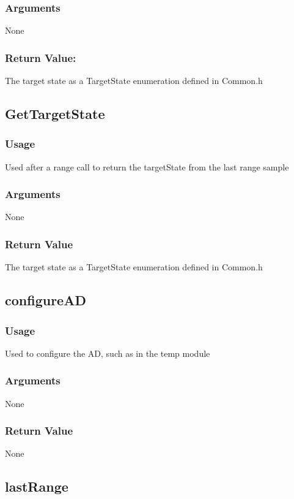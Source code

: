 \documentclass[]{report}
\begin{document}
\subsubsection{Arguments}
None

\subsubsection{Return Value:}
The target state as a TargetState enumeration defined in Common.h

\subsection{GetTargetState}
\subsubsection{Usage}
Used after a range call to return the targetState from the last range sample

\subsubsection{Arguments}
None

\subsubsection{Return Value}
The target state as a TargetState enumeration defined in Common.h

\subsection{configureAD}
\subsubsection{Usage}
Used to configure the AD, such as in the temp module

\subsubsection{Arguments}
None

\subsubsection{Return Value}
None

\subsection{lastRange}
\end{document}
